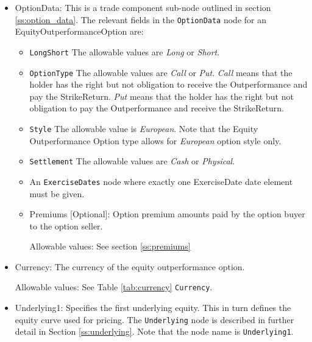 \begin{itemize}
\item OptionData: This is a trade component sub-node outlined in section \ref{ss:option_data}. The relevant fields in the \lstinline!OptionData! node for an EquityOutperformanceOption are:

\begin{itemize}
\item \lstinline!LongShort! The allowable values are \emph{Long} or \emph{Short}.

\item \lstinline!OptionType! The allowable values are \emph{Call} or \emph{Put}.  \emph{Call} means that the holder has the right but not obligation to receive the Outperformance and pay the StrikeReturn. \emph{Put} means that the holder has the right but not obligation to pay the Outperformance and receive the StrikeReturn.

\item  \lstinline!Style! The allowable value is \emph{European}. Note that the Equity Outperformance Option type allows for \emph{European} option style only. 

\item  \lstinline!Settlement! The allowable values are \emph{Cash} or \emph{Physical}.


\item An \lstinline!ExerciseDates! node where exactly one ExerciseDate date element must be given. 

\item Premiums [Optional]: Option premium amounts paid by the option buyer to the option seller.

Allowable values:  See section \ref{ss:premiums}

\end{itemize}



\item Currency: The currency of the equity outperformance option.

Allowable values:  See Table \ref{tab:currency} \lstinline!Currency!.
    
\item Underlying1:  Specifies the first underlying equity.  This in turn defines the equity curve used for pricing. The \lstinline!Underlying! node is described in further detail in Section \ref{ss:underlying}. Note that the node name is \lstinline!Underlying1!.


\end{itemize}
